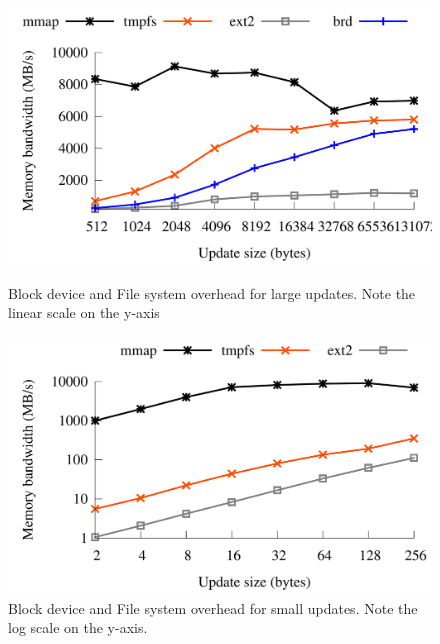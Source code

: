 \begin{figure}[t]
\begin{minipage}[b]{0.47\linewidth}
\centerline{\includegraphics[width=\columnwidth]{figs/block-fs-large}}
\caption[Block device and File system overhead for large updates]
        {Block device and File system overhead for large updates. Note
         the linear scale on the y-axis}
\label{fig:serial-large-block}
\end{minipage}
\hspace{0.04\linewidth}
\begin{minipage}[b]{0.47\linewidth}
\centerline{\includegraphics[width=\columnwidth]{figs/block-fs-small}}
\caption[Block device and File system overhead for small updates.]
        {Block device and File system overhead for small updates.  Note
        the log scale on the y-axis.}
\label{fig:serial-small-block}
\end{minipage}
\end{figure}

